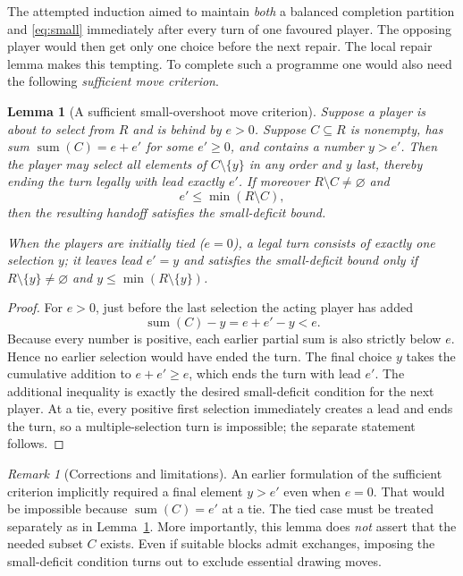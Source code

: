 \documentclass[11pt,a4paper]{article}
\newtheorem{lemma}[theorem]{Lemma}
\theoremstyle{definition}
\theoremstyle{remark}
\newtheorem{remark}[theorem]{Remark}
\newcommand{\sm}{\operatorname{sum}}
\begin{document}
The attempted induction aimed to maintain \emph{both} a balanced
completion partition and \eqref{eq:small} immediately after every
turn of one favoured player.  The opposing player would then get
only one choice before the next repair.  The local repair lemma makes
this tempting.  To complete such a programme one would also need
the following \emph{sufficient move criterion}.

\begin{lemma}[A sufficient small-overshoot move criterion]
\label{lem:overshoot}
Suppose a player is about to select from $R$ and is behind by
$e>0$.  Suppose $C\subseteq R$ is nonempty, has sum
$\sm(C)=e+e'$ for some $e'\ge0$, and contains a number $y>e'$.
Then the player may select all elements of $C\setminus\{y\}$ in
any order and $y$ last, thereby ending the turn \emph{legally}
with lead exactly $e'$.  If moreover $R\setminus C\ne\varnothing$ and
\[
e'\le\min(R\setminus C),
\]
then the resulting handoff satisfies the small-deficit bound.

When the players are initially tied ($e=0$), a legal turn consists
of \emph{exactly one} selection $y$; it leaves lead $e'=y$ and
satisfies the small-deficit bound only if
$R\setminus\{y\}\ne\varnothing$ and
$y\le\min(R\setminus\{y\})$.
\end{lemma}
\begin{proof}
For $e>0$, just before the last selection the acting player has
added
\[
\sm(C)-y=e+e'-y<e.
\]
Because every number is positive, each earlier partial sum is also
strictly below $e$.  Hence no earlier selection would have ended
the turn.  The final choice $y$ takes the cumulative addition to
$e+e'\ge e$, which ends the turn with lead $e'$.  The additional
inequality is exactly the desired small-deficit condition for the
next player.  At a tie, every positive first selection immediately
creates a lead and ends the turn, so a multiple-selection turn is
impossible; the separate statement follows.
\end{proof}

\begin{remark}[Corrections and limitations]
An earlier formulation of the sufficient criterion implicitly
required a final element $y>e'$ even when $e=0$.  That would be
impossible because $\sm(C)=e'$ at a tie.  The tied case must be
treated separately as in Lemma~\ref{lem:overshoot}.  More importantly,
this lemma does \emph{not} assert that the needed subset $C$ exists.
Even if suitable blocks admit exchanges, imposing the small-deficit
condition turns out to exclude essential drawing moves.
\end{remark}
\end{document}
